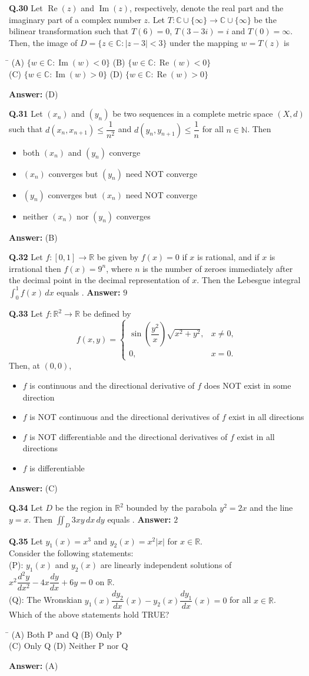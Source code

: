 \documentclass[11pt,a4paper]{article}
\newcommand{\optsfourA}[4]{%
  \begin{tabbing}
    \hspace{0.48\linewidth}\=\kill
    (A) #1 \> (B) #2 \\[2pt]
    (C) #3 \> (D) #4
  \end{tabbing}%
}
\newcommand{\optslistA}[4]{%
  \begin{itemize}
    \setlength{\itemsep}{2pt}\setlength{\parskip}{0pt}
    \item[(A)] #1
    \item[(B)] #2
    \item[(C)] #3
    \item[(D)] #4
  \end{itemize}%
}
\newcommand{\ans}[1]{\textbf{Answer:} #1\par\medskip}
\begin{document}
\textbf{Q.30} Let $\operatorname{Re}(z)$ and $\operatorname{Im}(z)$, respectively, denote the real part and the imaginary part of a complex number $z$. Let $T : \mathbb{C} \cup \{\infty\} \to \mathbb{C} \cup \{\infty\}$ be the bilinear transformation such that $T(6) = 0$, $T(3 - 3i) = i$ and $T(0) = \infty$. Then, the image of $D = \{z \in \mathbb{C} : |z - 3| < 3\}$ under the mapping $w = T(z)$ is
\optsfourA{$\{w \in \mathbb{C} : \operatorname{Im}(w) < 0\}$}{$\{w \in \mathbb{C} : \operatorname{Re}(w) < 0\}$}{$\{w \in \mathbb{C} : \operatorname{Im}(w) > 0\}$}{$\{w \in \mathbb{C} : \operatorname{Re}(w) > 0\}$}
\ans{(D)}

\textbf{Q.31} Let $(x_n)$ and $(y_n)$ be two sequences in a complete metric space $(X, d)$ such that $d(x_n, x_{n+1}) \le \dfrac{1}{n^2}$ and $d(y_n, y_{n+1}) \le \dfrac{1}{n}$ for all $n \in \mathbb{N}$. Then
\optslistA{both $(x_n)$ and $(y_n)$ converge}{$(x_n)$ converges but $(y_n)$ need NOT converge}{$(y_n)$ converges but $(x_n)$ need NOT converge}{neither $(x_n)$ nor $(y_n)$ converges}
\ans{(B)}

\textbf{Q.32} Let $f : [0, 1] \to \mathbb{R}$ be given by $f(x) = 0$ if $x$ is rational, and if $x$ is irrational then $f(x) = 9^n$, where $n$ is the number of zeroes immediately after the decimal point in the decimal representation of $x$. Then the Lebesgue integral $\displaystyle\int_0^1 f(x)\,dx$ equals \underline{\hspace{2cm}}.
\ans{$9$}

\textbf{Q.33} Let $f : \mathbb{R}^2 \to \mathbb{R}$ be defined by
\[
  f(x, y) = \begin{cases}
    \sin\!\left(\dfrac{y^2}{x}\right)\sqrt{x^2 + y^2}, & x \neq 0, \\[8pt]
    0, & x = 0.
  \end{cases}
\]
Then, at $(0, 0)$,
\optslistA{$f$ is continuous and the directional derivative of $f$ does NOT exist in some direction}{$f$ is NOT continuous and the directional derivatives of $f$ exist in all directions}{$f$ is NOT differentiable and the directional derivatives of $f$ exist in all directions}{$f$ is differentiable}
\ans{(C)}

\textbf{Q.34} Let $D$ be the region in $\mathbb{R}^2$ bounded by the parabola $y^2 = 2x$ and the line $y = x$. Then $\displaystyle\iint_D 3xy\,dx\,dy$ equals \underline{\hspace{2cm}}.
\ans{$2$}

\textbf{Q.35} Let $y_1(x) = x^3$ and $y_2(x) = x^2 |x|$ for $x \in \mathbb{R}$.\\
Consider the following statements:\\
(P): $y_1(x)$ and $y_2(x)$ are linearly independent solutions of $x^2 \dfrac{d^2 y}{dx^2} - 4x \dfrac{dy}{dx} + 6y = 0$ on $\mathbb{R}$.\\
(Q): The Wronskian $y_1(x)\dfrac{dy_2}{dx}(x) - y_2(x)\dfrac{dy_1}{dx}(x) = 0$ for all $x \in \mathbb{R}$.\\
Which of the above statements hold TRUE?
\optsfourA{Both P and Q}{Only P}{Only Q}{Neither P nor Q}
\ans{(A)}
\end{document}
